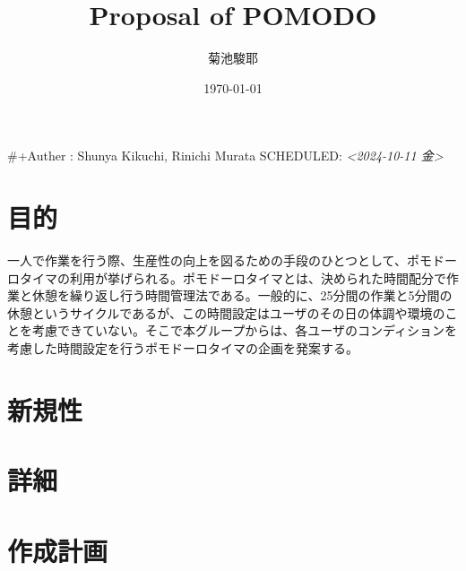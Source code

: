 \documentclass[11pt]{article}
\author{菊池駿耶}
\date{\today}
\title{Proposal of POMODO}
\begin{document}
\maketitle
\tableofcontents

\#+Auther : Shunya Kikuchi, Rinichi Murata
SCHEDULED: \textit{<2024-10-11 金>}
\section{目的}
\label{sec:org1a4dcfa}
一人で作業を行う際、生産性の向上を図るための手段のひとつとして、ポモドーロタイマの利用が挙げられる。ポモドーロタイマとは、決められた時間配分で作業と休憩を繰り返し行う時間管理法である。一般的に、25分間の作業と5分間の休憩というサイクルであるが、この時間設定はユーザのその日の体調や環境のことを考慮できていない。そこで本グループからは、各ユーザのコンディションを考慮した時間設定を行うポモドーロタイマの企画を発案する。
\section{新規性}
\label{sec:orgee2a9ca}

\section{詳細}
\label{sec:org6e8301e}

\section{作成計画}
\label{sec:org5507dde}
\end{document}

